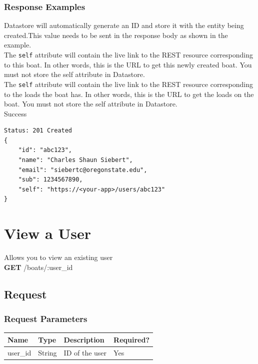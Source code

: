 \documentclass[letterpaper,11pt,titlepage,draftclsnofoot,onecolumn,compsoc,utf8,latin1]{IEEEtran}
\begin{document}
\begin{singlespace}
\subsubsection{Response Examples}

Datastore will automatically generate an ID and store it with the entity being created.This value needs to be sent in the response body as shown in the example.\\

\noindent The \texttt{self} attribute will contain the live link to the REST resource corresponding to this boat. In other words, this is the URL to get this newly created boat. You must not store the self attribute in Datastore.\\

\noindent The \texttt{self} attribute will contain the live link to the REST resource corresponding to the loads the boat has. In other words, this is the URL to get the loads on the boat. You must not store the self attribute in Datastore.\\

\noindent \Large{Success}

\begin{lstlisting}[]
Status: 201 Created
{
    "id": "abc123",
    "name": "Charles Shaun Siebert",
    "email": "siebertc@oregonstate.edu",
    "sub": 1234567890,
    "self": "https://<your-app>/users/abc123"
}
\end{lstlisting}

\newpage 

\normalsize

\section{View a User}

Allows you to view an existing user\\

\noindent \textbf{GET} /boats/:user\_id

\subsection{Request}

\subsubsection{Request Parameters}

\begin{center}
    \begin{tabular}{ | p{} | p{} | p{} | p{} |}
    \hline
        \textbf{Name} & \textbf{Type} & \textbf{Description} &\textbf{Required?}  \\ \hline
        user\_id & String & ID of the user & Yes \\
    \hline
    \end{tabular}
\end{center}


\end{singlespace}
\end{document}
